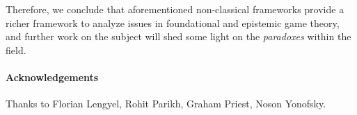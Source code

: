 \documentclass{article}
\begin{document}
Therefore, we conclude that aforementioned non-classical frameworks provide a richer framework to analyze issues in foundational and epistemic game theory, and further work on the subject will shed some light on the \emph{paradoxes} within the field.

\paragraph{Acknowledgements} Thanks to Florian Lengyel, Rohit Parikh, Graham Priest, Noson Yonofsky.

  
 
\end{document}
